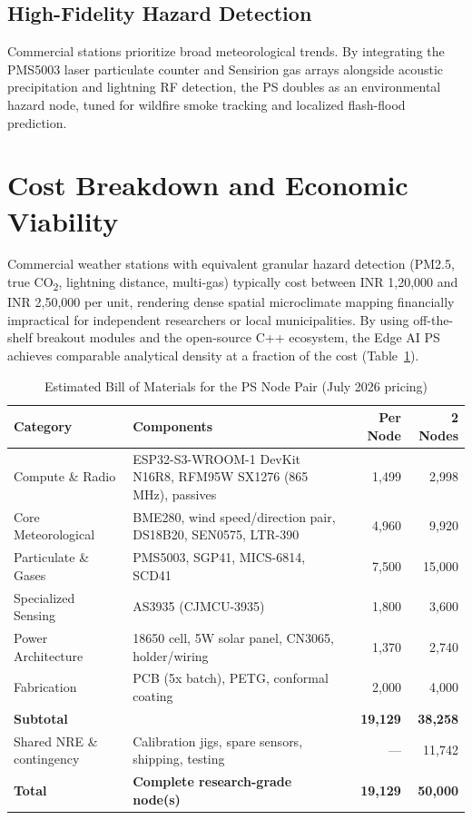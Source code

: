 \documentclass[conference]{IEEEtran}
\begin{document}
\subsection{High-Fidelity Hazard Detection}

Commercial stations prioritize broad meteorological trends. By
integrating the PMS5003 laser particulate counter and Sensirion gas
arrays alongside acoustic precipitation and lightning RF detection, the
PS doubles as an environmental hazard node, tuned for wildfire smoke
tracking and localized flash-flood prediction.

\section{Cost Breakdown and Economic Viability}
\label{sec:cost}

Commercial weather stations with equivalent granular hazard detection
(PM2.5, true CO\textsubscript{2}, lightning distance, multi-gas)
typically cost between INR 1,20,000 and INR 2,50,000 per unit, rendering
dense spatial microclimate mapping financially impractical for
independent researchers or local municipalities. By using off-the-shelf
breakout modules and the open-source C++ ecosystem, the Edge AI PS
achieves comparable analytical density at a fraction of the cost
(Table~\ref{tab:bom}).

\begin{table}[htbp]
\caption{Estimated Bill of Materials for the PS Node Pair (July 2026 pricing)}
\label{tab:bom}
\centering
\begin{tabular}{@{}p{2.1cm}p{2.8cm}rr@{}}
\toprule
\textbf{Category} & \textbf{Components} & \textbf{Per Node} & \textbf{2 Nodes} \\
\midrule
Compute \& Radio & ESP32-S3-WROOM-1 DevKit N16R8, RFM95W SX1276 (865 MHz), passives & 1,499 & 2,998 \\
Core Meteorological & BME280, wind speed/direction pair, DS18B20, SEN0575, LTR-390 & 4,960 & 9,920 \\
Particulate \& Gases & PMS5003, SGP41, MICS-6814, SCD41 & 7,500 & 15,000 \\
Specialized Sensing & AS3935 (CJMCU-3935) & 1,800 & 3,600 \\
Power Architecture & 18650 cell, 5W solar panel, CN3065, holder/wiring & 1,370 & 2,740 \\
Fabrication & PCB (5x batch), PETG, conformal coating & 2,000 & 4,000 \\
\midrule
\textbf{Subtotal} & & \textbf{19,129} & \textbf{38,258} \\
Shared NRE \& contingency & Calibration jigs, spare sensors, shipping, testing & --- & 11,742 \\
\midrule
\textbf{Total} & \textbf{Complete research-grade node(s)} & \textbf{19,129} & \textbf{50,000} \\
\bottomrule
\end{tabular}
\end{table}
\end{document}

